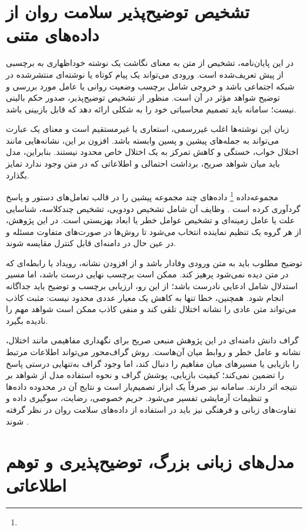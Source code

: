 \section{تشخیص توضیح‌پذیر سلامت روان از داده‌های متنی}

در این پایان‌نامه، تشخیص از متن به معنای نگاشت یک نوشته خوداظهاری به برچسبی از پیش تعریف‌شده است. ورودی می‌تواند یک پیام کوتاه یا نوشته‌ای منتشرشده در شبکه اجتماعی باشد و خروجی شامل برچسب وضعیت روانی یا عامل مورد بررسی و توضیح شواهد مؤثر در آن است. منظور از تشخیص توضیح‌پذیر، صدور حکم بالینی نیست؛ سامانه باید تصمیم محاسباتی خود را به شکلی ارائه دهد که قابل بازبینی باشد.

زبان این نوشته‌ها اغلب غیررسمی، استعاری یا غیرمستقیم است و معنای یک عبارت می‌تواند به جمله‌های پیشین و پسین وابسته باشد. افزون بر این، نشانه‌هایی مانند اختلال خواب، خستگی و کاهش تمرکز به یک اختلال خاص محدود نیستند. بنابراین، مدل باید میان شواهد صریح، برداشت احتمالی و اطلاعاتی که در متن وجود ندارد تمایز بگذارد.

مجموعه‌داده \footnote{} داده‌های چند مجموعه پیشین را در قالب تعامل‌های دستور و پاسخ گردآوری کرده است \cite{yang2023towards,yang2024mentallama}. وظایف آن شامل تشخیص دودویی، تشخیص چندکلاسه، شناسایی علت یا عامل زمینه‌ای و تشخیص عوامل خطر یا ابعاد بهزیستی است. در این پژوهش، از هر گروه یک تنظیم نماینده انتخاب می‌شود تا روش‌ها در صورت‌های متفاوت مسئله و در عین حال در دامنه‌ای قابل کنترل مقایسه شوند.

توضیح مطلوب باید به متن ورودی وفادار باشد و از افزودن نشانه، رویداد یا رابطه‌ای که در متن دیده نمی‌شود پرهیز کند. ممکن است برچسب نهایی درست باشد، اما مسیر استدلال شامل ادعایی نادرست باشد؛ از این رو، ارزیابی برچسب و توضیح باید جداگانه انجام شود. همچنین، خطا تنها به کاهش یک معیار عددی محدود نیست: مثبت کاذب می‌تواند متن عادی را نشانه اختلال تلقی کند و منفی کاذب ممکن است شواهد مهم را نادیده بگیرد.

گراف دانش دامنه‌ای در این پژوهش منبعی صریح برای نگهداری مفاهیمی مانند اختلال، نشانه و عامل خطر و روابط میان آن‌هاست. روش گراف‌محور می‌تواند اطلاعات مرتبط را بازیابی یا مسیرهای میان مفاهیم را دنبال کند، اما وجود گراف به‌تنهایی درستی پاسخ را تضمین نمی‌کند؛ کیفیت بازیابی، پوشش گراف و نحوه استفاده مدل از شواهد بر نتیجه اثر دارند. سامانه نیز صرفاً یک ابزار تصمیم‌یار است و نتایج آن در محدوده داده‌ها و تنظیمات آزمایشی تفسیر می‌شود. حریم خصوصی، رضایت، سوگیری داده و تفاوت‌های زبانی و فرهنگی نیز باید در استفاده از داده‌های سلامت روان در نظر گرفته شوند \cite{who2021aiethics}.

\section{مدل‌های زبانی بزرگ، توضیح‌پذیری و توهم اطلاعاتی}

